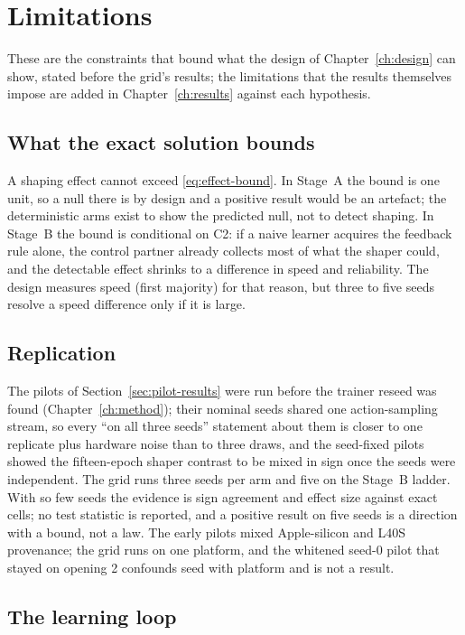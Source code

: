\chapter{Limitations}
\label{ch:lim}

These are the constraints that bound what the design of
Chapter~\ref{ch:design} can show, stated before the grid's results; the
limitations that the results themselves impose are added in
Chapter~\ref{ch:results} against each hypothesis.

\section{What the exact solution bounds}

A shaping effect cannot exceed \eqref{eq:effect-bound}.
In Stage~A the bound is one unit, so a null there is by design and a
positive result would be an artefact; the deterministic arms exist to
show the predicted null, not to detect shaping.
In Stage~B the bound is conditional on C2: if a naive learner acquires
the feedback rule alone, the control partner already collects most of
what the shaper could, and the detectable effect shrinks to a difference
in speed and reliability.
The design measures speed (first majority) for that reason, but three to
five seeds resolve a speed difference only if it is large.

\section{Replication}

The pilots of Section~\ref{sec:pilot-results} were run before the trainer
reseed was found (Chapter~\ref{ch:method}); their nominal seeds shared
one action-sampling stream, so every ``on all three seeds'' statement
about them is closer to one replicate plus hardware noise than to three
draws, and the seed-fixed pilots showed the fifteen-epoch shaper
contrast to be mixed in sign once the seeds were independent.
The grid runs three seeds per arm and five on the Stage~B ladder.
With so few seeds the evidence is sign agreement and effect size against
exact cells; no test statistic is reported, and a positive result on
five seeds is a direction with a bound, not a law.
The early pilots mixed Apple-silicon and L40S provenance; the grid runs
on one platform, and the whitened seed-0 pilot that stayed on opening 2
confounds seed with platform and is not a result.

\section{The learning loop}

